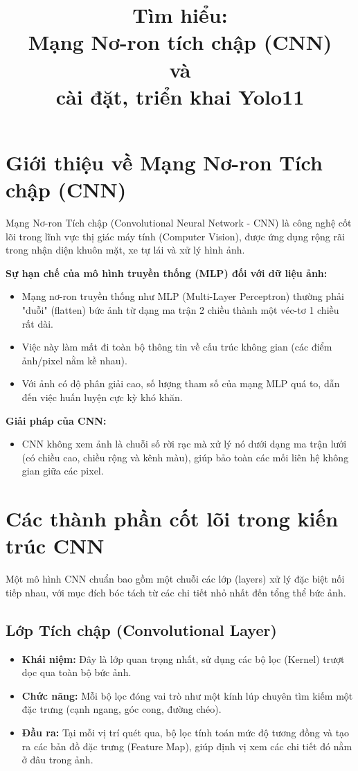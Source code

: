 \documentclass[12pt,a4paper]{article}
\title{Tìm hiểu: \\ Mạng Nơ-ron tích chập (CNN)\\ và \\cài đặt, triển khai Yolo11}
\author{}
\date{}
\begin{document}
\maketitle

\newpage


\section{Giới thiệu về Mạng Nơ-ron Tích chập (CNN)}
Mạng Nơ-ron Tích chập (Convolutional Neural Network - CNN) là công nghệ cốt lõi trong lĩnh vực thị giác máy tính (Computer Vision), được ứng dụng rộng rãi trong nhận diện khuôn mặt, xe tự lái và xử lý hình ảnh.

\textbf{Sự hạn chế của mô hình truyền thống (MLP) đối với dữ liệu ảnh:}
\begin{itemize}
    \item Mạng nơ-ron truyền thống như MLP (Multi-Layer Perceptron) thường phải "duỗi" (flatten) bức ảnh từ dạng ma trận 2 chiều thành một véc-tơ 1 chiều rất dài.
    \item Việc này làm mất đi toàn bộ thông tin về cấu trúc không gian (các điểm ảnh/pixel nằm kề nhau).
    \item Với ảnh có độ phân giải cao, số lượng tham số của mạng MLP quá to, dẫn đến việc huấn luyện cực kỳ khó khăn.
\end{itemize}

\textbf{Giải pháp của CNN:}
\begin{itemize}
    \item CNN không xem ảnh là chuỗi số rời rạc mà xử lý nó dưới dạng ma trận lưới (có chiều cao, chiều rộng và kênh màu), giúp bảo toàn các mối liên hệ không gian giữa các pixel.
\end{itemize}

\section{Các thành phần cốt lõi trong kiến trúc CNN}
Một mô hình CNN chuẩn bao gồm một chuỗi các lớp (layers) xử lý đặc biệt nối tiếp nhau, với mục đích bóc tách từ các chi tiết nhỏ nhất đến tổng thể bức ảnh.

\subsection{Lớp Tích chập (Convolutional Layer)}
\begin{itemize}
    \item \textbf{Khái niệm:} Đây là lớp quan trọng nhất, sử dụng các bộ lọc (Kernel) trượt dọc qua toàn bộ bức ảnh.
    \item \textbf{Chức năng:} Mỗi bộ lọc đóng vai trò như một kính lúp chuyên tìm kiếm một đặc trưng (cạnh ngang, góc cong, đường chéo).
    \item \textbf{Đầu ra:} Tại mỗi vị trí quét qua, bộ lọc tính toán mức độ tương đồng và tạo ra các bản đồ đặc trưng (Feature Map), giúp định vị xem các chi tiết đó nằm ở đâu trong ảnh.
\end{itemize}
\end{document}

